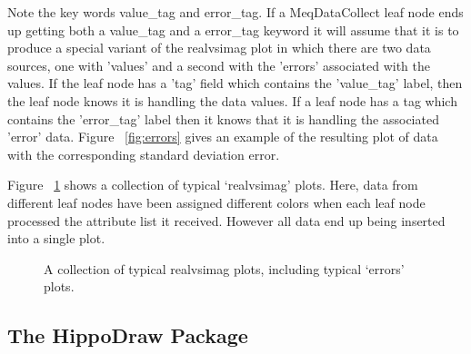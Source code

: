 \documentclass[10pt]{article}
\begin{document}
Note the key words value\_tag and error\_tag.
If a MeqDataCollect leaf node ends up getting both a value\_tag and a error\_tag
keyword it will assume that it is to produce a special variant of
the realvsimag plot in which there are two data sources, one with 'values' and
a second with the 'errors' associated with the values. If the leaf node
has a 'tag' field which contains the 'value\_tag' label, then the
leaf node knows it is handling the data values. If a leaf node has a tag
which contains the 'error\_tag' label then it knows that it is handling
the associated 'error' data. Figure ~\ref{fig:errors} gives an example
of the resulting plot of data with the corresponding standard deviation
error.

Figure ~\ref{fig:realvsimag} shows a collection of typical `realvsimag' plots. 
Here, data from different leaf nodes have been assigned different colors 
when each leaf node processed the attribute list it received. However all data
end up being inserted into a single plot. 

\begin{figure}
{\par\centering
{}
\par}
\caption {A collection of typical realvsimag plots, including typical `errors' plots. }
\label{fig:realvsimag}
\end{figure}


\subsection {The HippoDraw Package}
\end{document}
